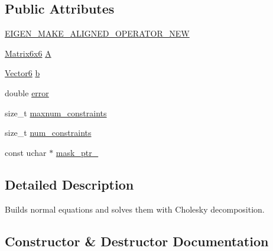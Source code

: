 \subsection*{Public Attributes}
\begin{DoxyCompactItemize}
\item 
\mbox{\hyperlink{classdvo_1_1core_1_1_precomputed_normal_equations_least_squares_a5e379002dbbd2569ed4f0580eab97156}{E\+I\+G\+E\+N\+\_\+\+M\+A\+K\+E\+\_\+\+A\+L\+I\+G\+N\+E\+D\+\_\+\+O\+P\+E\+R\+A\+T\+O\+R\+\_\+\+N\+EW}}
\item 
\mbox{\hyperlink{namespacedvo_1_1core_a7b76cdc563f01ec2220fd58316004626}{Matrix6x6}} \mbox{\hyperlink{classdvo_1_1core_1_1_precomputed_normal_equations_least_squares_a95ecca09c734f950f5e6c03d2e1c5e76}{A}}
\item 
\mbox{\hyperlink{namespacedvo_1_1core_a05327f3312d32a301bce9fccda9e5807}{Vector6}} \mbox{\hyperlink{classdvo_1_1core_1_1_precomputed_normal_equations_least_squares_a81f932997bbc52fe2df57403e64fd6f6}{b}}
\item 
double \mbox{\hyperlink{classdvo_1_1core_1_1_precomputed_normal_equations_least_squares_ab466793175fcae83f158540f07e0cdb2}{error}}
\item 
size\+\_\+t \mbox{\hyperlink{classdvo_1_1core_1_1_precomputed_normal_equations_least_squares_aac9bca6070c75a91e4c2777b137df9a2}{maxnum\+\_\+constraints}}
\item 
size\+\_\+t \mbox{\hyperlink{classdvo_1_1core_1_1_precomputed_normal_equations_least_squares_a1895a0916656b67cdc410d627f779a94}{num\+\_\+constraints}}
\item 
const uchar $\ast$ \mbox{\hyperlink{classdvo_1_1core_1_1_precomputed_normal_equations_least_squares_a06ee504a39a8ebf770bcec527e22fd34}{mask\+\_\+ptr\+\_\+}}
\end{DoxyCompactItemize}


\subsection{Detailed Description}
Builds normal equations and solves them with Cholesky decomposition. 

\subsection{Constructor \& Destructor Documentation}
\mbox{\label{classdvo_1_1core_1_1_precomputed_normal_equations_least_squares_aaadc7769e3857383066d302426d3cf3a}} 
